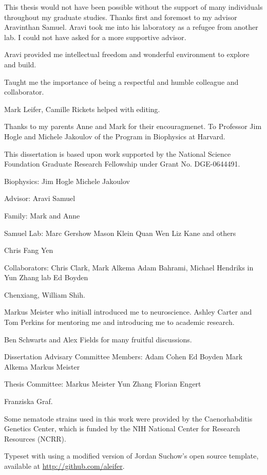 
This thesis would not have been possible without the support of many individuals throughout my graduate studies. Thanks first and foremost to my advisor Aravinthan Samuel. Aravi took me into his laboratory as a refugee from another lab. I could not have asked for a more supportive advisor. 

Aravi provided me intellectual freedom and wonderful environment to explore and build.

Taught me the importance of being a respectful and humble colleague and collaborator. 


Mark Leifer, Camille Rickets helped with editing. 


Thanks to my parents Anne and Mark for their encouragmenet. To Professor Jim Hogle and Michele Jakoulov of the Program in Biophysics at Harvard. 

This dissertation is based upon work supported by the National Science Foundation Graduate Research Fellowship under Grant No. DGE-0644491.

Biophysics:
  Jim Hogle
  Michele Jakoulov

Advisor:
  Aravi Samuel

Family:
  Mark and Anne

Samuel Lab:
  Marc Gershow
  Mason Klein
  Quan Wen
  Liz Kane and others

Chris Fang Yen

Collaborators:
   Chris Clark, Mark Alkema
   Adam Bahrami, Michael Hendriks in Yun Zhang lab
   Ed Boyden

Chenxiang, William Shih.
   

Markus Meister who initiall introduced me to neuroscience. 
Ashley Carter and Tom Perkins for mentoring me and introducing me to academic research. 

Ben Schwarts and Alex Fields for many fruitful discussions.

Dissertation Advisary Committee Members:
   Adam Cohen
   Ed Boyden
   Mark Alkema
   Markus Meister
   
Thesis Committee:
	Markus Meister
	Yun Zhang
	Florian Engert

Franziska Graf.

Some nematode strains used in this work were provided by the Caenorhabditis Genetics Center, which is funded by the NIH National Center for Research Resources (NCRR).

Typeset with \XeTeX using a modified version of Jordan Suchow's open source template, available at \href{https://github.com/aleifer/LaTeX-template-for-Harvard-dissertation}{http://github.com/aleifer}.